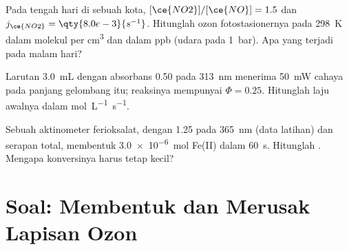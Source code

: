 \begin{exercise}[$\star\star\star$]\label{exo:b3:photochemistry:10}
Pada tengah hari di sebuah kota, $[\ce{NO2}]/[\ce{NO}] = 1.5$ dan
$j_{\ce{NO2}} = \qty{8.0e-3}{s^{-1}}$. Hitunglah ozon fotostasionernya pada
\qty{298}{K} dalam molekul per \unit{cm^3} dan dalam ppb (udara pada \qty{1}{bar}).
Apa yang terjadi pada malam hari?
\end{exercise}

\begin{exercise}[$\star\star\star$]\label{exo:b3:photochemistry:11}
Larutan \qty{3.0}{mL} dengan absorbans 0.50 pada \qty{313}{nm} menerima
\qty{50}{mW} cahaya pada panjang gelombang itu; reaksinya mempunyai
$\Phi = 0.25$. Hitunglah laju awalnya dalam \unit{mol.L^{-1}.s^{-1}}.
\end{exercise}

\begin{exercise}[$\star\star\star$]\label{exo:b3:photochemistry:12}
Sebuah aktinometer ferioksalat, dengan  1.25 pada
\qty{365}{nm} (data latihan) dan serapan total, membentuk \qty{3.0e-6}{mol}
Fe(II) dalam \qty{60}{s}. Hitunglah . Mengapa konversinya harus
tetap kecil?
\end{exercise}

\section{Soal: Membentuk dan Merusak Lapisan Ozon}

